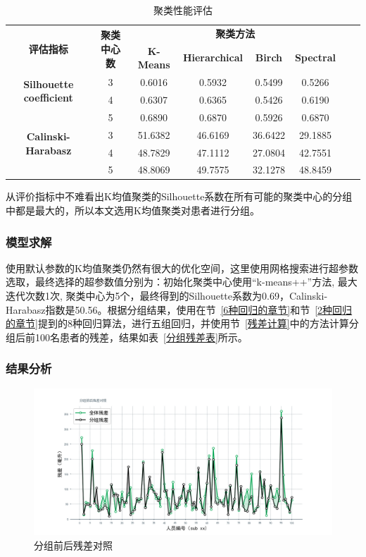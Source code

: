 \documentclass[bwprint]{gmcmthesis}
\begin{document}
\begin{table}[ht]
\centering
\caption{聚类性能评估}
\begin{tabular}{cccccccc}
\toprule
\multirow{2}{*}{\textbf{评估指标}} & \multirow{2}{*}{\textbf{聚类中心数}}& \multicolumn{4}{c}{\textbf{聚类方法}}  \\
\cmidrule{3-6}
&& \textbf{K-Means} & \textbf{Hierarchical} & \textbf{Birch} & \textbf{Spectral} \\
\midrule
\multirow{2}{*}{\textbf{Silhouette coefficient}}&3 & 0.6016 & 0.5932 & 0.5499 & 0.5266  \\
& 4& 0.6307 & 0.6365 & 0.5426 & 0.6190  \\
& 5& 0.6890 & 0.6870 & 0.5926 & 0.6870  \\
\midrule
\multirow{2}{*}{\textbf{Calinski-Harabasz}} & 3& 51.6382 & 46.6169 & 36.6422 & 29.1885  \\
& 4& 48.7829 & 47.1112 & 27.0804 & 42.7551  \\
& 5& 48.8069 & 49.7575 & 32.1278 & 48.8459  \\
\bottomrule
\end{tabular}
\end{table}

从评价指标中不难看出K均值聚类的Silhouette系数在所有可能的聚类中心的分组中都是最大的，所以本文选用K均值聚类对患者进行分组。

\subsubsection{模型求解}

使用默认参数的K均值聚类仍然有很大的优化空间，这里使用网格搜索进行超参数选取，最终选择的超参数值分别为：初始化聚类中心使用“k-means++”方法, 最大迭代次数1次, 聚类中心为5个，最终得到的Silhouette系数为0.69，Calinski-Harabasz指数是50.56。根据分组结果，使用在节~\ref{6种回归的章节}和节~\ref{2种回归的章节}提到的8种回归算法，进行五组回归，并使用节~\ref{残差计算}中的方法计算分组后前100名患者的残差，结果如表~\ref{分组残差表}所示。


\subsubsection{结果分析}
\begin{figure}[!h]
\centering
\includegraphics[width=\textwidth]{fig_me/残差对照.png}
\caption{分组前后残差对照}
\label{分组前后残差对照}
\end{figure}
\end{document}

